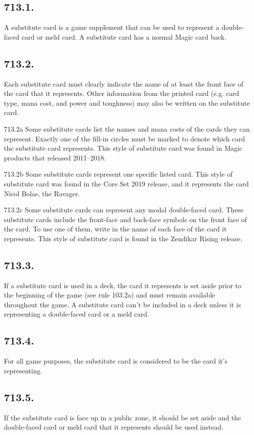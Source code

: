 \subsection*{713.1.}
A substitute card is a game supplement that can be used to represent a double-faced card or meld card. A substitute card has a normal Magic card back.

\subsection*{713.2.}
Each substitute card must clearly indicate the name of at least the front face of the card that it represents. Other information from the printed card (e.g. card type, mana cost, and power and toughness) may also be written on the substitute card.

713.2a Some substitute cards list the names and mana costs of the cards they can represent. Exactly one of the fill-in circles must be marked to denote which card the substitute card represents. This style of substitute card was found in Magic products that released 2011–2018.

713.2b Some substitute cards represent one specific listed card. This style of substitute card was found in the Core Set 2019 release, and it represents the card Nicol Bolas, the Ravager.

713.2c Some substitute cards can represent any modal double-faced card. These substitute cards include the front-face and back-face symbols on the front face of the card. To use one of them, write in the name of each face of the card it represents. This style of substitute card is found in the Zendikar Rising release.

\subsection*{713.3.}
If a substitute card is used in a deck, the card it represents is set aside prior to the beginning of the game (see rule 103.2a) and must remain available throughout the game. A substitute card can’t be included in a deck unless it is representing a double-faced card or a meld card.

\subsection*{713.4.}
For all game purposes, the substitute card is considered to be the card it’s representing.

\subsection*{713.5.}
If the substitute card is face up in a public zone, it should be set aside and the double-faced card or meld card that it represents should be used instead.

